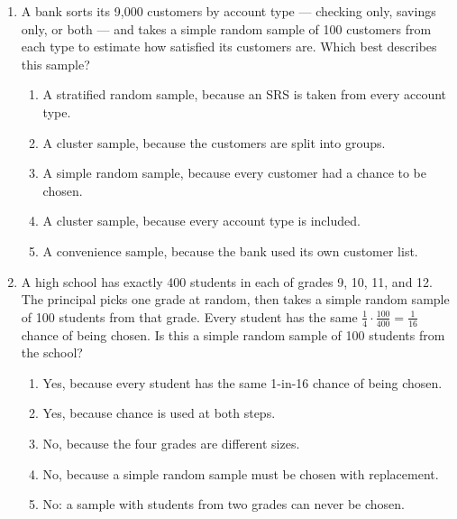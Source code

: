 \documentclass[12pt]{article}
\begin{document}
\begin{enumerate}[leftmargin=1.9em, itemsep=0.13in]
  \boxguard[12]
  \item A bank sorts its 9{,}000 customers by account type --- checking only, savings only, or
        both --- and takes a simple random sample of 100 customers from each type to estimate
        how satisfied its customers are. Which best describes this sample?
        \begin{enumerate}[label=\textbf{(\Alph*)}, leftmargin=2.2em, itemsep=2pt]
          \item A stratified random sample, because an SRS is taken from every account type.
          \item A cluster sample, because the customers are split into groups.
          \item A simple random sample, because every customer had a chance to be chosen.
          \item A cluster sample, because every account type is included.
          \item A convenience sample, because the bank used its own customer list.\hfill{}\rule[-0.2in]{0pt}{0.48in}
        \end{enumerate}

  \boxguard[13]
  \item A high school has exactly 400 students in each of grades 9, 10, 11, and 12. The
        principal picks one grade at random, then takes a simple random sample of 100 students
        from that grade. Every student has the same $\tfrac{1}{4}\cdot\tfrac{100}{400} =
        \tfrac{1}{16}$ chance of being chosen. Is this a simple random sample of 100 students
        from the school?
        \begin{enumerate}[label=\textbf{(\Alph*)}, leftmargin=2.2em, itemsep=2pt]
          \item Yes, because every student has the same 1-in-16 chance of being chosen.
          \item Yes, because chance is used at both steps.
          \item No, because the four grades are different sizes.
          \item No, because a simple random sample must be chosen with replacement.
          \item No: a sample with students from two grades can never be chosen.\hfill{}\rule[-0.2in]{0pt}{0.48in}
        \end{enumerate}


\end{enumerate}
\end{document}
